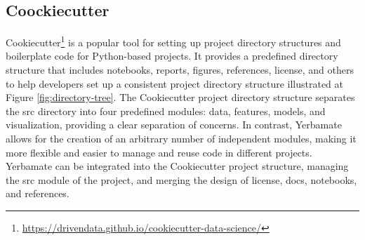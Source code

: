 \subsection{Coockiecutter}
Cookiecutter\footnote{\url{https://drivendata.github.io/cookiecutter-data-science/}} is a popular tool for setting up project directory structures and boilerplate code for Python-based projects. It provides a predefined directory structure that includes notebooks, reports, figures, references, license, and others to help developers set up a consistent project directory structure illustrated at Figure \ref{fig:directory-tree}. The Cookiecutter project directory structure separates the src directory into four predefined modules: data, features, models, and visualization, providing a clear separation of concerns. In contrast, Yerbamate allows for the creation of an arbitrary number of independent modules, making it more flexible and easier to manage and reuse code in different projects. Yerbamate can be integrated into the Cookiecutter project structure, managing the src module of the project, and merging the design of license, docs, notebooks, and references. 


